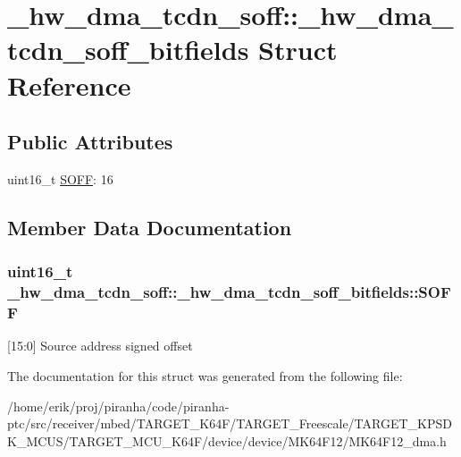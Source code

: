 \hypertarget{struct__hw__dma__tcdn__soff_1_1__hw__dma__tcdn__soff__bitfields}{}\section{\+\_\+hw\+\_\+dma\+\_\+tcdn\+\_\+soff\+:\+:\+\_\+hw\+\_\+dma\+\_\+tcdn\+\_\+soff\+\_\+bitfields Struct Reference}
\label{struct__hw__dma__tcdn__soff_1_1__hw__dma__tcdn__soff__bitfields}
\subsection*{Public Attributes}
\begin{DoxyCompactItemize}
\item 
uint16\+\_\+t \hyperlink{struct__hw__dma__tcdn__soff_1_1__hw__dma__tcdn__soff__bitfields_a3cb18c7c68adde4feebb005121b196dc}{S\+O\+FF}\+: 16
\end{DoxyCompactItemize}


\subsection{Member Data Documentation}
\subsubsection[{\texorpdfstring{S\+O\+FF}{SOFF}}]{\setlength{\rightskip}{0pt plus 5cm}uint16\+\_\+t \+\_\+hw\+\_\+dma\+\_\+tcdn\+\_\+soff\+::\+\_\+hw\+\_\+dma\+\_\+tcdn\+\_\+soff\+\_\+bitfields\+::\+S\+O\+FF}\hypertarget{struct__hw__dma__tcdn__soff_1_1__hw__dma__tcdn__soff__bitfields_a3cb18c7c68adde4feebb005121b196dc}{}\label{struct__hw__dma__tcdn__soff_1_1__hw__dma__tcdn__soff__bitfields_a3cb18c7c68adde4feebb005121b196dc}
\mbox{[}15\+:0\mbox{]} Source address signed offset 

The documentation for this struct was generated from the following file\+:\begin{DoxyCompactItemize}
\item 
/home/erik/proj/piranha/code/piranha-\/ptc/src/receiver/mbed/\+T\+A\+R\+G\+E\+T\+\_\+\+K64\+F/\+T\+A\+R\+G\+E\+T\+\_\+\+Freescale/\+T\+A\+R\+G\+E\+T\+\_\+\+K\+P\+S\+D\+K\+\_\+\+M\+C\+U\+S/\+T\+A\+R\+G\+E\+T\+\_\+\+M\+C\+U\+\_\+\+K64\+F/device/device/\+M\+K64\+F12/M\+K64\+F12\+\_\+dma.\+h\end{DoxyCompactItemize}
